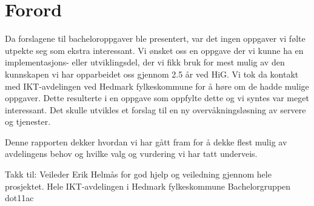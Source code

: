 \chapter*{Forord}
Da forslagene til bacheloroppgaver ble presentert, var det ingen oppgaver vi følte utpekte seg som ekstra interessant. Vi ønsket oss en oppgave der vi kunne ha en implementasjons- eller utviklingsdel, der vi fikk bruk for mest mulig av den kunnskapen vi har opparbeidet oss gjennom 2.5 år ved HiG. Vi tok da kontakt med IKT-avdelingen ved Hedmark fylkeskommune for å høre om de hadde mulige oppgaver. Dette resulterte i en oppgave som oppfylte dette og vi syntes var meget interessant. Det skulle utvikles et forslag til en ny overvåkningsløsning av servere og tjenester. 

Denne rapporten dekker hvordan vi har gått fram for å dekke flest mulig av avdelingens behov og hvilke valg og vurdering vi har tatt underveis.
 
Takk til:
    Veileder Erik Helmås for god hjelp og veiledning gjennom hele prosjektet.
    Hele IKT-avdelingen i Hedmark fylkeskommune
    Bachelorgruppen dot11ac


